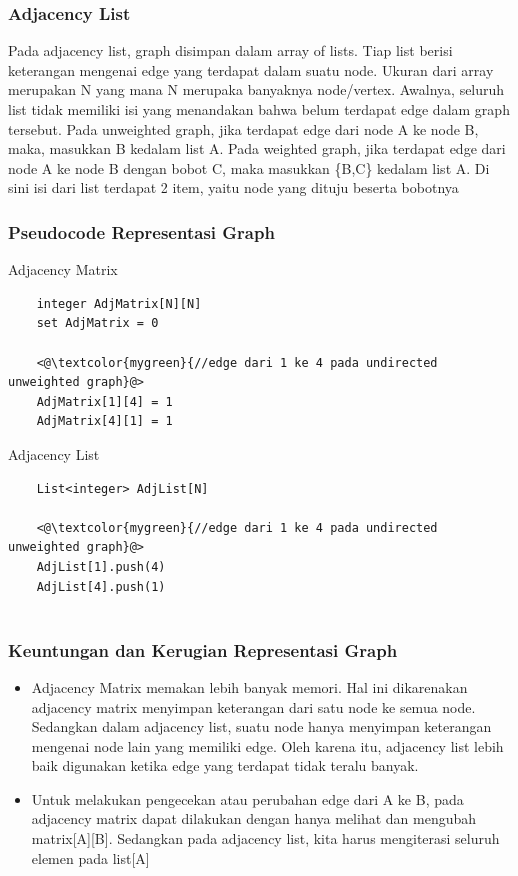 \begin{frame}
\frametitle{Adjacency List}

Pada adjacency list, graph disimpan dalam array of lists. Tiap list berisi keterangan mengenai edge yang terdapat dalam suatu node. Ukuran dari array merupakan N yang mana N merupaka banyaknya node/vertex. \newline\newline
Awalnya, seluruh list tidak memiliki isi yang menandakan bahwa belum terdapat edge dalam graph tersebut. Pada unweighted graph, jika terdapat edge dari node A ke node B, maka, masukkan B kedalam list A. Pada weighted graph, jika terdapat edge dari node A ke node B dengan bobot C, maka masukkan \{B,C\} kedalam list A. Di sini isi dari list terdapat 2 item, yaitu node yang dituju beserta bobotnya
\end{frame}


\begin{frame}[fragile]
\frametitle{Pseudocode Representasi Graph}

Adjacency Matrix
\begin{lstlisting}
	integer AdjMatrix[N][N]
	set AdjMatrix = 0
	
	<@\textcolor{mygreen}{//edge dari 1 ke 4 pada undirected unweighted graph}@>
	AdjMatrix[1][4] = 1
	AdjMatrix[4][1] = 1
\end{lstlisting}
Adjacency List
\begin{lstlisting}
	List<integer> AdjList[N]
	
	<@\textcolor{mygreen}{//edge dari 1 ke 4 pada undirected unweighted graph}@>
	AdjList[1].push(4)
	AdjList[4].push(1)
	
\end{lstlisting}
\end{frame}

\begin{frame}
\frametitle{Keuntungan dan Kerugian Representasi Graph}

\begin{itemize}
	\item Adjacency Matrix memakan lebih banyak memori. Hal ini dikarenakan adjacency matrix menyimpan keterangan dari satu node ke semua node. Sedangkan dalam adjacency list, suatu node hanya menyimpan keterangan mengenai node lain yang memiliki edge. Oleh karena itu, adjacency list lebih baik digunakan ketika edge yang terdapat tidak teralu banyak.
	\item Untuk melakukan pengecekan atau perubahan edge dari A ke B, pada adjacency matrix dapat dilakukan dengan hanya melihat dan mengubah matrix[A][B]. Sedangkan pada adjacency list, kita harus mengiterasi seluruh elemen pada list[A]
\end{itemize}
\end{frame}

